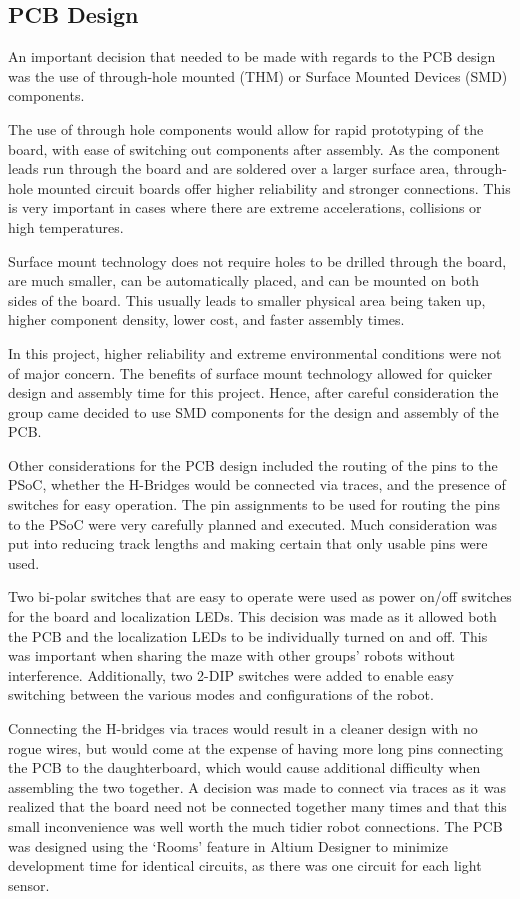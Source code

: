 \documentclass{article}
\begin{document}
\subsection{PCB Design}

An important decision that needed to be made with regards to the PCB design was the use of through-hole mounted (THM) or Surface Mounted Devices (SMD) components.

The use of through hole components would allow for rapid prototyping of the board, with ease of switching out components after assembly. As the component leads run through the board and are soldered over a larger surface area, through-hole mounted circuit boards offer higher reliability and stronger connections. This is very important in cases where there are extreme accelerations, collisions or high temperatures.

Surface mount technology does not require holes to be drilled through the board, are much smaller, can be automatically placed, and can be mounted on both sides of the board. This usually leads to smaller physical area being taken up, higher component density, lower cost, and faster assembly times. 

In this project, higher reliability and extreme environmental conditions were not of major concern. The benefits of surface mount technology allowed for quicker design and assembly time for this project. Hence, after careful consideration the group came decided to use SMD components for the design and assembly of the PCB.

Other considerations for the PCB design included the routing of the pins to the PSoC, whether the H-Bridges would be connected via traces, and the presence of switches for easy operation. The pin assignments to be used for routing the pins to the PSoC were very carefully planned and executed. Much consideration was put into reducing track lengths and making certain that only usable pins were used.

Two bi-polar switches that are easy to operate were used as power on/off switches for the board and localization LEDs. This decision was made as it allowed both the PCB and the localization LEDs to be individually turned on and off. This was important when sharing the maze with other groups' robots without interference. Additionally, two 2-DIP switches were added to enable easy switching between the various modes and configurations of the robot.

Connecting the H-bridges via traces would result in a cleaner design with no rogue wires, but would come at the expense of having more long pins connecting the PCB to the daughterboard, which would cause additional difficulty when assembling the two together. A decision was made to connect via traces as it was realized that the board need not be connected together many times and that this small inconvenience was well worth the much tidier robot connections. The PCB was designed using the `Rooms' feature in Altium Designer to minimize development time for identical circuits, as there was one circuit for each light sensor.
\end{document}
